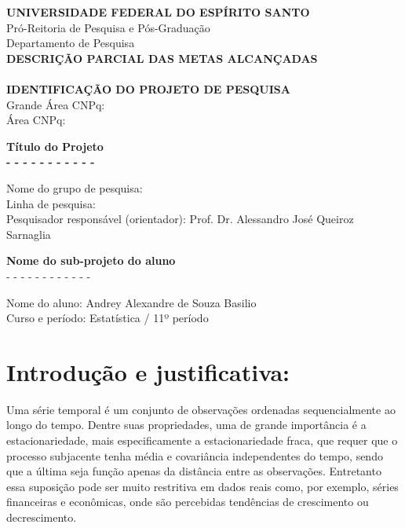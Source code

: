 \documentclass[10pt, a4paper]{article}
\begin{document}
\begin{center}

{\bf \Large UNIVERSIDADE FEDERAL DO ESPÍRITO SANTO}\\
Pró-Reitoria de Pesquisa e Pós-Graduação\\
Departamento de Pesquisa\\
{\bf \Large DESCRIÇÃO PARCIAL DAS METAS ALCANÇADAS}\\
\ \\
{\bf \Large IDENTIFICAÇÃO DO PROJETO DE PESQUISA}\\
Grande Área CNPq: \\
Área CNPq:

\vspace{1cm}

{\bf \Large Título do Projeto}\\
{\bf  - - - - - - - - - - -}
\end{center}
%
Nome do grupo de pesquisa: \\
Linha de pesquisa: \\
Pesquisador responsável (orientador): Prof. Dr. Alessandro José Queiroz Sarnaglia


\vspace{1.5cm}

\begin{center}
{\bf \Large Nome do sub-projeto do aluno}\\
{- - - - - - - - - - - - }
\end{center}
%
Nome do aluno: Andrey Alexandre de Souza Basilio \\
Curso e período: Estatística / 11º período



\vspace{.5cm}

\clearpage
  
\section*{Introdução e justificativa:}
Uma série temporal é um conjunto de observações ordenadas sequencialmente ao longo do tempo. Dentre suas propriedades, uma de grande importância é a estacionariedade, mais especificamente a estacionariedade fraca, que requer que o processo subjacente tenha média e covariância independentes do tempo, sendo que a última seja função apenas da distância entre as observações. Entretanto essa suposição pode ser muito restritiva em dados reais como, por exemplo, séries financeiras e econômicas, onde são percebidas tendências de crescimento ou decrescimento. 
\end{document}
